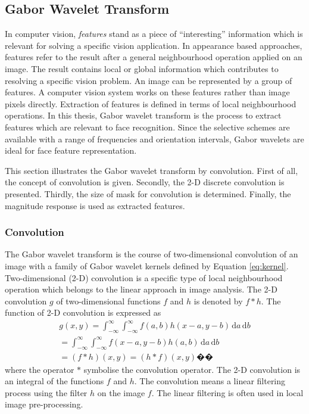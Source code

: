 \subsection{Gabor Wavelet Transform}
\label{sec:gaborwavelettransform}
In computer vision, \textit{features} stand as a piece of ``interesting'' information which is relevant for solving a specific vision application. In appearance based approaches, features refer to the result after a general neighbourhood operation applied on an image. The result contains local or global information which contributes to resolving a specific vision problem. An image can be represented by a group of features. A computer vision system works on these features rather than image pixels directly.
Extraction of features is defined in terms of local neighbourhood operations. In this thesis, Gabor wavelet transform is the process to extract features which are relevant to face recognition. Since the selective schemes are available with a range of frequencies and orientation intervals, Gabor wavelets are ideal for face feature representation.

This section illustrates the Gabor wavelet transform by convolution. First of all, the concept of convolution is given. Secondly, the 2-D discrete convolution is presented. Thirdly, the size of mask for convolution is determined. Finally, the magnitude response is used as extracted features.
\subsubsection{Convolution}
The Gabor wavelet transform is the course of two-dimensional convolution of an image with a family of Gabor wavelet kernels defined by \mbox{Equation} \ref{eq:kernel}. Two-dimensional (2-D) convolution \cite{Sonka1998} is a specific type of local neighbourhood operation which belongs to the linear approach in image analysis. The 2-D convolution $g$ of two-dimensional functions $f$ and $h$ is denoted by $f*h$. The function of 2-D convolution is expressed as
\newcommand{\ud}{\mathrm{d}}
{\setlength\arraycolsep{2pt}
\begin{eqnarray}\label{eq:conv2}
 g(x, y) = \int_{-\infty}^{\infty}\int_{-\infty}^{\infty}f(a,b)h(x-a,y-b) \, \ud a \, \ud b \nonumber\\
= \int_{-\infty}^{\infty}\int_{-\infty}^{\infty}f(x-a,y-b)h(a,b) \, \ud a \, \ud b \nonumber\\
= (f*h)(x,y) = (h*f)(x,y) ��\end{eqnarray}
} 
where the operator $*$ symbolise the convolution operator. The 2-D convolution is an integral of the functions $f$ and $h$. The convolution means a linear filtering process using the filter $h$ on the image $f$.  The linear filtering is often used in local image pre-processing.

